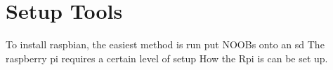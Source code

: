 \section{Setup Tools}


To install raspbian, the easiest method is run put NOOBs onto an sd 
The raspberry pi requires a certain level of setup
How the Rpi is can be set up.